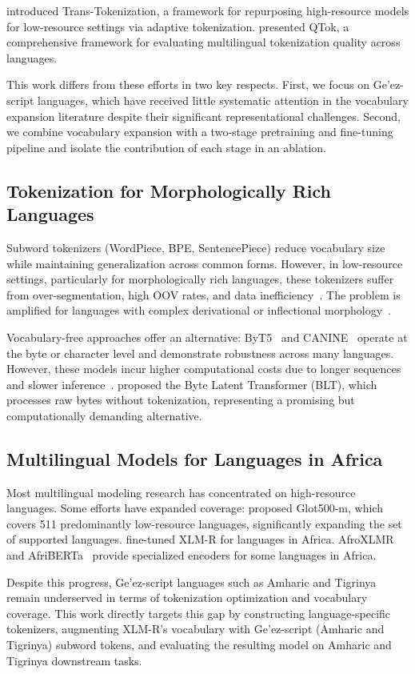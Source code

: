 \citet{remy2024trans} introduced Trans-Tokenization, a framework for repurposing high-resource models for low-resource settings via adaptive tokenization. \citet{chelombitko2024qtok} presented QTok, a comprehensive framework for evaluating multilingual tokenization quality across languages.

This work differs from these efforts in two key respects. First, we focus on Ge'ez-script languages, which have received little systematic attention in the vocabulary expansion literature despite their significant representational challenges. Second, we combine vocabulary expansion with a two-stage pretraining and fine-tuning pipeline and isolate the contribution of each stage in an ablation.

\subsection{Tokenization for Morphologically Rich Languages}
Subword tokenizers (WordPiece, BPE, SentencePiece) reduce vocabulary size while maintaining generalization across common forms. However, in low-resource settings, particularly for morphologically rich languages, these tokenizers suffer from over-segmentation, high OOV rates, and data inefficiency~\cite{limisiewicz2023tokenization,beinborn2023analyzing}. The problem is amplified for languages with complex derivational or inflectional morphology~\cite{chai2024tokenization}.

Vocabulary-free approaches offer an alternative: ByT5~\cite{xue2022byt5} and CANINE~\cite{clark2022canine} operate at the byte or character level and demonstrate robustness across many languages. However, these models incur higher computational costs due to longer sequences and slower inference~\cite{xue2021mt5,liang2023xlmv}. \citet{pagnoni2024byte} proposed the Byte Latent Transformer (BLT), which processes raw bytes without tokenization, representing a promising but computationally demanding alternative.

\subsection{Multilingual Models for Languages in Africa}
Most multilingual modeling research has concentrated on high-resource languages. Some efforts have expanded coverage: \citet{imanigooghari2023glot500} proposed Glot500-m, which covers 511 predominantly low-resource languages, significantly expanding the set of supported languages. \citet{alabi2022adapting} fine-tuned XLM-R for languages in Africa. AfroXLMR~\cite{alabi2022adapting} and AfriBERTa~\cite{ogueji2021small} provide specialized encoders for some languages in Africa.

Despite this progress, Ge'ez-script languages such as Amharic and Tigrinya remain underserved in terms of tokenization optimization and vocabulary coverage. This work directly targets this gap by constructing language-specific tokenizers, augmenting XLM-R's vocabulary with Ge'ez-script (Amharic and Tigrinya) subword tokens, and evaluating the resulting model on Amharic and Tigrinya downstream tasks.
